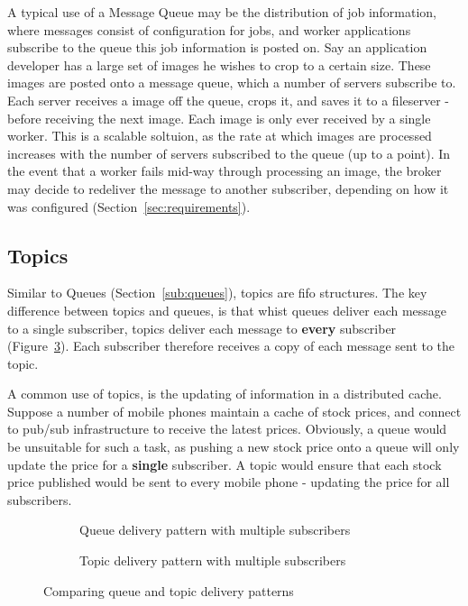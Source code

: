 A typical use of a Message Queue may be the distribution of job information,
where messages consist of configuration for jobs, and worker applications
subscribe to the queue this job information is posted on. Say an application
developer has a large set of images he wishes to crop to a certain size. These
images are posted onto a message queue, which a number of servers subscribe to.
Each server receives a image off the queue, crops it, and saves it to a
fileserver - before receiving the next image. Each image is only ever received
by a single worker. This is a scalable soltuion, as the rate at which images are
processed increases with the number of servers subscribed to the queue (up to a
point). In the event that a worker fails mid-way through processing an image,
the broker may decide to redeliver the message to another subscriber, depending
on how it was configured (Section~\ref{sec:requirements}).

\subsection{Topics}
\label{sub:topics}

Similar to Queues (Section~\ref{sub:queues}), topics are \gls{fifo} structures.
The key difference between topics and queues, is that whist queues deliver each
message to a single subscriber, topics deliver each message to \textbf{every}
subscriber (Figure~\ref{fig:tikz:queueVsTopic}). Each subscriber therefore
receives a copy of each message sent to the topic.

A common use of topics, is the updating of information in a distributed cache.
Suppose a number of mobile phones maintain a cache of stock prices, and
connect to pub/sub infrastructure to receive the latest prices. Obviously, a
queue would be unsuitable for such a task, as pushing a new stock price onto a
queue will only update the price for a \textbf{single} subscriber. A topic
would ensure that each stock price published would be sent to every mobile phone -
updating the price for all subscribers.

\begin{figure}[htbp]
  \centering
  \begin{subfigure}[t]{0.5\textwidth}
    \centering
    
    \caption{Queue delivery pattern with multiple subscribers}
    \label{fig:tikz:messageBrokerQueue}
  \end{subfigure}

  \begin{subfigure}[t]{0.5\textwidth}
    \centering
    
    \caption{Topic delivery pattern with multiple subscribers}
    \label{fig:tikz:messageBrokerTopic}
  \end{subfigure}
  \caption{Comparing queue and topic delivery patterns}
  \label{fig:tikz:queueVsTopic}
\end{figure}

